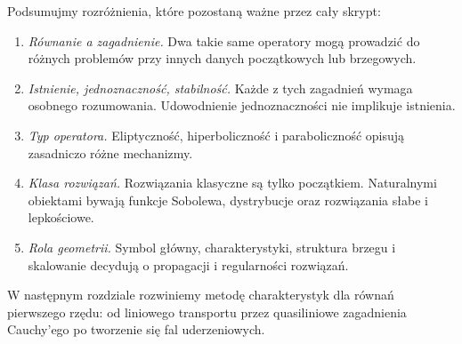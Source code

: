 Podsumujmy rozróżnienia, które pozostaną ważne przez cały skrypt:
\begin{enumerate}
\item \emph{Równanie a zagadnienie.} Dwa takie same operatory
mogą prowadzić do różnych problemów przy innych danych
początkowych lub brzegowych.
\item \emph{Istnienie, jednoznaczność, stabilność.} Każde z tych
zagadnień wymaga osobnego rozumowania. Udowodnienie
jednoznaczności nie implikuje istnienia.
\item \emph{Typ operatora.} Eliptyczność, hiperboliczność
i paraboliczność opisują zasadniczo różne mechanizmy.
\item \emph{Klasa rozwiązań.} Rozwiązania klasyczne są tylko
początkiem. Naturalnymi obiektami bywają funkcje Sobolewa,
dystrybucje oraz rozwiązania słabe i lepkościowe.
\item \emph{Rola geometrii.} Symbol główny, charakterystyki,
struktura brzegu i skalowanie decydują o propagacji
i regularności rozwiązań.
\end{enumerate}

W następnym rozdziale rozwiniemy metodę charakterystyk dla
równań pierwszego rzędu: od liniowego transportu przez
quasiliniowe zagadnienia Cauchy'ego po tworzenie się
fal uderzeniowych.

